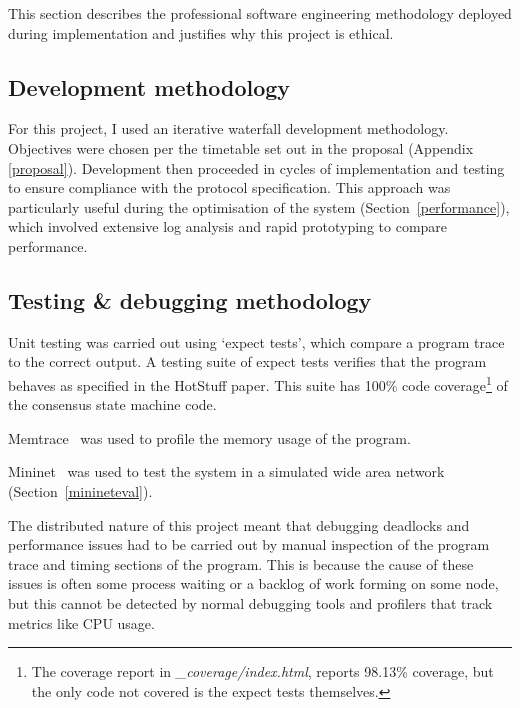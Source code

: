 This section describes the professional software engineering methodology deployed during implementation and justifies why this project is ethical.

\subsection{Development methodology} \label{devmethods}

For this project, I used an iterative waterfall development methodology. Objectives were chosen per the timetable set out in the proposal (Appendix \ref{proposal}). Development then proceeded in cycles of implementation and testing to ensure compliance with the protocol specification. This approach was particularly useful during the optimisation of the system (Section~\ref{performance}), which involved extensive log analysis and rapid prototyping to compare performance.

\subsection{Testing \& debugging methodology} \label{testing}

Unit testing was carried out using `expect tests', which compare a program trace to the correct output. A testing suite of expect tests verifies that the program behaves as specified in the HotStuff paper. This suite has 100\% code coverage\footnote{The coverage report in \textit{\_coverage/index.html}, reports 98.13\% coverage, but the only code not covered is the expect tests themselves.} of the consensus state machine code.%

Memtrace~\cite{memtrace} was used to profile the memory usage of the program. %

Mininet~\cite{mininet,lantzNetworkLaptopRapid2010} was used to test the system in a simulated wide area network (Section~\ref{minineteval}).

The distributed nature of this project meant that debugging deadlocks and performance issues had to be carried out by manual inspection of the program trace and timing sections of the program. This is because the cause of these issues is often some process waiting or a backlog of work forming on some node, but this cannot be detected by normal debugging tools and profilers that track metrics like CPU usage.

